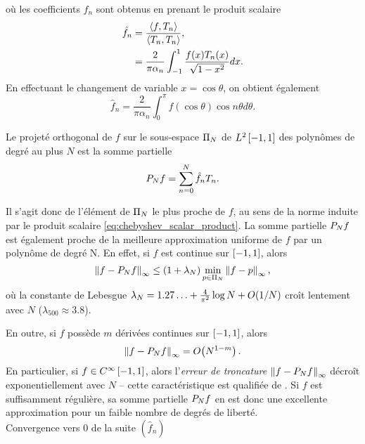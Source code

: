où les coefficients $\hat{f}_n$ sont obtenus en prenant le produit scalaire
\begin{align}
	\hat{f}_n 
	&= \frac{\scalprod{f}{T_n}}{\scalprod{T_n}{T_n}}, \nonumber \\
	&= \frac{2}{\pi \alpha_n} \int_{-1}^{1} \frac{f(x) T_n(x)}{\sqrt{1 - x^2}} dx.
	\label{eq:chebyshev_series_coeffs}
\end{align}
En effectuant le changement de variable $x = \cos \theta$, on obtient également
\begin{equation}
	\hat{f}_n = \frac{2}{\pi \alpha_n} \int_{0}^{\pi} f(\cos \theta) \cos n \theta d \theta. 
\end{equation}

Le projeté orthogonal de $f$ sur le sous-espace $\polyspace{N}$ de $\Ltwospace$ des polynômes de degré au plus $N$ est la somme partielle%
\begin{equation}
	\truncseries{f}{N} = \sum_{n=0}^{N} \hat{f}_n T_n.
	\label{chebyshev_truncated_series}
\end{equation}

Il s'agit donc de l'élément de $\polyspace{N}$ le plus proche de $f$, au sens de la norme induite par le produit scalaire \eqref{eq:chebyshev_scalar_product}.
La somme partielle $\truncseries{f}{N}$ est également proche de la meilleure approximation uniforme de $f$ par un polynôme de degré N. En effet, si $f$ est continue sur $\chebinterval$, alors
\begin{equation}
	\norminf{f - \truncseries{f}{N}} 
	\leq 
	\left(1 + \lambda_N \right) 
	\min_{p \in \polyspace{N}} \norminf{f - p},
	\label{eq:chebyshev_near_minimax}
\end{equation}
où la constante de Lebesgue $\lambda_N = 1.27\ldots + \frac{4}{\pi^2} \log N + \bigO{1/N}$ croît %
lentement avec $N$ ($\lambda_{500} \approx 3.8$).\par
En outre, si $f$ possède $m$ dérivées continues sur $\chebinterval$, alors
\begin{equation}
	\norminf{f - \truncseries{f}{N}} = \bigO{N^{1-m}}.
	\label{eq:chebyshev_spectral_accuracy}
\end{equation}
En particulier, si $f \in C^{\infty}\chebinterval$, alors l'\textit{erreur de troncature} $\norminf{f - \truncseries{f}{N}}$ décroît exponentiellement avec $N$ -- 
cette caractéristique est qualifiée de .
Si $f$ est suffisamment régulière, sa somme partielle $\truncseries{f}{N}$ en est donc une excellente approximation pour un faible nombre de degrés de liberté.\\
Convergence vers 0 de la suite $(\hat{f}_n)$
\par\bigskip

